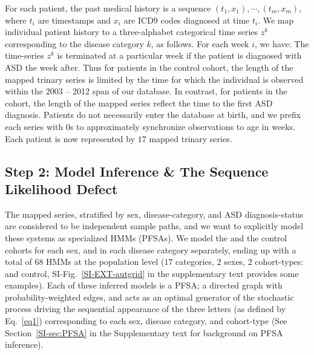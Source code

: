 \documentclass[onecolumn,10pt]{IEEEtran}
\begin{document}
For each patient, the past  medical history is a sequence $(t_1,x_1),\cdots,(t_m,x_m)$, where $t_i$ are timestamps and $x_i$ are ICD9 codes diagnosed at time $t_i$.  We map individual patient history to a three-alphabet categorical time series $z^k$ corresponding to the disease category $k$,  as follows. For each week $i$, we have: 
\noindent
                The time-series $z^k$ is terminated at a particular week if the patient is diagnosed with ASD the week after. Thus for patients in the control cohort, the length of the mapped trinary series is limited by the time for which the individual is observed within the  2003 -- 2012 span of our database. In contrast, for patients in  the \treatment cohort, the length of the mapped series reflect the time to the first ASD diagnosis. Patients do not necessarily enter the database at birth, and we prefix each series with 0s to  approximately synchronize observations to age in weeks. Each patient is now represented by $17$ mapped trinary series.
\subsection*{Step 2: Model Inference \& The Sequence Likelihood Defect}
The mapped series, stratified by  sex, disease-category, and ASD diagnosis-status are considered to be independent sample paths, and we want to explicitly model these systems as specialized HMMs (PFSAs). We model the \treatment and the control cohorts for each sex, and in  each disease category separately, ending up with a total of $68$ HMMs at the population level ($17$ categories, $2$ sexes, $2$ cohort-types: \treatment and control, SI-Fig.~\ref{SI-EXT-autgrid} in the supplementary text provides some examples). Each of these inferred models is  a PFSA;  a directed graph with probability-weighted edges, and acts as an optimal generator of the  stochastic process driving the  sequential appearance of the three letters (as defined by Eq.~\eqref{eq1})  corresponding to each sex, disease category, and cohort-type (See Section~\ref{SI-sec:PFSA} in the Supplementary text for  background on PFSA inference). 
\end{document}
